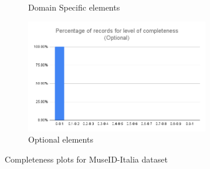 \documentclass[epsfig,a4paper,12pt,titlepage]{book}
\begin{document}
\begin{figure}[h]
\begin{subfigure}[b]{0.475\textwidth}
            \caption[]%
            {{\small Domain Specific elements}}    
            \label{fig:mdi_c}
        \end{subfigure}
        \hfill
        \begin{subfigure}[b]{0.475\textwidth}   
            \centering 
            \includegraphics[width=8cm]{mdi_optional.png}
            \caption[]%
            {{\small Optional elements}}    
            \label{fig:mdi_d}
        \end{subfigure}
        \caption[ Completeness plots for MuseID-Italia dataset ]
        {\small Completeness plots for MuseID-Italia dataset } 
        \label{fig:mdi_ratio}
    \end{figure}
    
\end{document}
